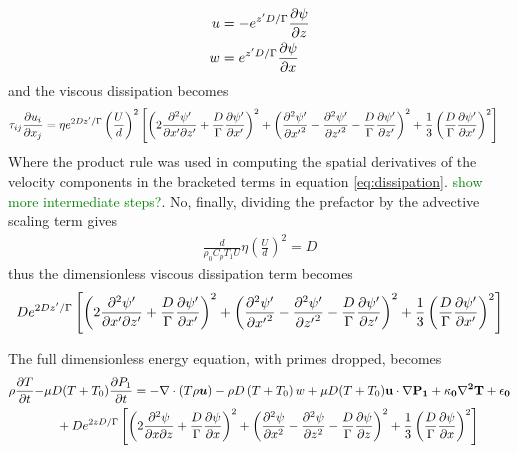 \documentclass[document.tex]{subfiles}
\begin{document}
\begin{mdframed}
    \begin{align*}
        u &= -e^{z'D/\Gamma}\pdv{\psi}{z} \\
        w &= e^{z'D/\Gamma}\pdv{\psi}{x}
    \end{align*}
    and the viscous dissipation becomes
    \begin{align*}
        \tau_{ij}\pdv{u_i}{x_j} &= \eta e^{2Dz'/\Gamma} \left(\frac{U}{d}\right)^2
  \left[
    \left( 2\pdv{\psi'}{x'}{z'} + \frac{D}{\Gamma}\pdv{\psi'}{x'} \right)^{2}
  + \left( \pdv[2]{\psi'}{{x'}} - \pdv[2]{\psi'}{{z'}} - \frac{D}{\Gamma}\pdv{\psi'}{z'} \right)^{2}
  + \frac{1}{3}\left( \frac{D}{\Gamma}\pdv{\psi'}{x'} \right)^{2}
  \right]
    \end{align*}
    Where the product rule was used in computing the spatial derivatives of the velocity components in the bracketed 
    terms in equation \eqref{eq:dissipation}. \textcolor{green}{show more intermediate steps?}. 
    No, finally, dividing the prefactor by the advective scaling term gives
    \begin{align*}
        \frac{d}{\rho_0C_p T_1 U} \eta \left(\frac{U}{d}\right)^2 = D
    \end{align*} 
    thus the dimensionless viscous dissipation term becomes 
    \begin{align*}
    De^{2Dz'/\Gamma} \left[
    \left( 2\pdv{\psi'}{x'}{z'} + \frac{D}{\Gamma}\pdv{\psi'}{x'} \right)^{2}
  + \left( \pdv[2]{\psi'}{{x'}} - \pdv[2]{\psi'}{{z'}} - \frac{D}{\Gamma}\pdv{\psi'}{z'} \right)^{2}
  + \frac{1}{3}\left( \frac{D}{\Gamma}\pdv{\psi'}{x'} \right)^{2}
  \right]
    \end{align*}
\end{mdframed}

The full dimensionless energy equation, with primes dropped, becomes 
\begin{align}
    \rho \pdv{T}{t} - &\mu D (T+T_0) \pdv{P_1}{t}
  = -\nabla\cdot\left( T \rho \bm{u} \right)
     - \rho D \left( T + T_0 \right) w
     + \mu D (T+T_0) \bf{u}\cdot\nabla P_1
     + \kappa_0 \nabla^{2} T + \epsilon_0 \notag \\
  &\quad + D e^{2zD/\Gamma}
  \left[
    \left( 2\pdv{\psi}{x}{z} + \frac{D}{\Gamma}\pdv{\psi}{x} \right)^{2}
  + \left( \pdv[2]{\psi}{x} - \pdv[2]{\psi}{z} - \frac{D}{\Gamma}\pdv{\psi}{z} \right)^{2}
  + \frac{1}{3}\left( \frac{D}{\Gamma}\pdv{\psi}{x} \right)^{2}
  \right] \label{eq:30}
\end{align}
\end{document}
